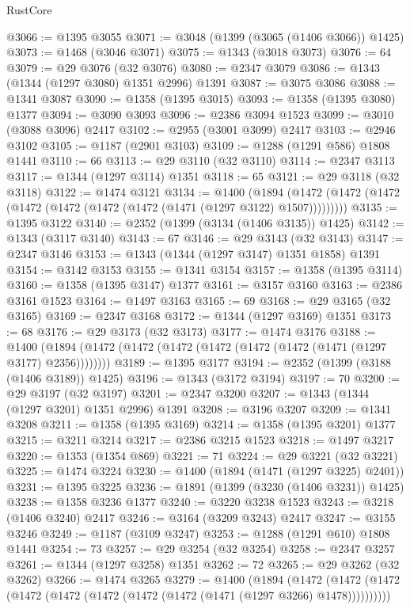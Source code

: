 \begin{lexlean}{RustCore}
\begin{coremodule}
{\begin{coremodule}
{{{{{{{{{{{{{{{{{{{{{{{{{{{{{{{{{{{{{{{{{{{{@3066 := @1395 @3055
@3071 := @3048 (@1399 (@3065 (@1406 @3066)) @1425)
@3073 := @1468 (@3046 @3071)
@3075 := @1343 (@3018 @3073)
@3076 := 64
@3079 := @29 @3076 (@32 @3076)
@3080 := @2347 @3079
@3086 := @1343 (@1344 (@1297 @3080) @1351 @2996) @1391
@3087 := @3075 @3086
@3088 := @1341 @3087
@3090 := @1358 (@1395 @3015)
@3093 := @1358 (@1395 @3080) @1377
@3094 := @3090 @3093
@3096 := @2386 @3094 @1523
@3099 := @3010 (@3088 @3096) @2417
@3102 := @2955 (@3001 @3099) @2417
@3103 := @2946 @3102
@3105 := @1187 (@2901 @3103)
@3109 := @1288 (@1291 @586) @1808 @1441
@3110 := 66
@3113 := @29 @3110 (@32 @3110)
@3114 := @2347 @3113
@3117 := @1344 (@1297 @3114) @1351
@3118 := 65
@3121 := @29 @3118 (@32 @3118)
@3122 := @1474 @3121
@3134 := @1400
    (@1894 (@1472 (@1472 (@1472 (@1472 (@1472 (@1472 (@1472 (@1471 (@1297 @3122) @1507)))))))))
@3135 := @1395 @3122
@3140 := @2352 (@1399 (@3134 (@1406 @3135)) @1425)
@3142 := @1343 (@3117 @3140)
@3143 := 67
@3146 := @29 @3143 (@32 @3143)
@3147 := @2347 @3146
@3153 := @1343 (@1344 (@1297 @3147) @1351 @1858) @1391
@3154 := @3142 @3153
@3155 := @1341 @3154
@3157 := @1358 (@1395 @3114)
@3160 := @1358 (@1395 @3147) @1377
@3161 := @3157 @3160
@3163 := @2386 @3161 @1523
@3164 := @1497 @3163
@3165 := 69
@3168 := @29 @3165 (@32 @3165)
@3169 := @2347 @3168
@3172 := @1344 (@1297 @3169) @1351
@3173 := 68
@3176 := @29 @3173 (@32 @3173)
@3177 := @1474 @3176
@3188 := @1400 (@1894 (@1472 (@1472 (@1472 (@1472 (@1472 (@1472 (@1471 (@1297 @3177) @2356))))))))
@3189 := @1395 @3177
@3194 := @2352 (@1399 (@3188 (@1406 @3189)) @1425)
@3196 := @1343 (@3172 @3194)
@3197 := 70
@3200 := @29 @3197 (@32 @3197)
@3201 := @2347 @3200
@3207 := @1343 (@1344 (@1297 @3201) @1351 @2996) @1391
@3208 := @3196 @3207
@3209 := @1341 @3208
@3211 := @1358 (@1395 @3169)
@3214 := @1358 (@1395 @3201) @1377
@3215 := @3211 @3214
@3217 := @2386 @3215 @1523
@3218 := @1497 @3217
@3220 := @1353 (@1354 @869)
@3221 := 71
@3224 := @29 @3221 (@32 @3221)
@3225 := @1474 @3224
@3230 := @1400 (@1894 (@1471 (@1297 @3225) @2401))
@3231 := @1395 @3225
@3236 := @1891 (@1399 (@3230 (@1406 @3231)) @1425)
@3238 := @1358 @3236 @1377
@3240 := @3220 @3238 @1523
@3243 := @3218 (@1406 @3240) @2417
@3246 := @3164 (@3209 @3243) @2417
@3247 := @3155 @3246
@3249 := @1187 (@3109 @3247)
@3253 := @1288 (@1291 @610) @1808 @1441
@3254 := 73
@3257 := @29 @3254 (@32 @3254)
@3258 := @2347 @3257
@3261 := @1344 (@1297 @3258) @1351
@3262 := 72
@3265 := @29 @3262 (@32 @3262)
@3266 := @1474 @3265
@3279 := @1400
    (@1894
      (@1472 (@1472 (@1472 (@1472 (@1472 (@1472 (@1472 (@1472 (@1471 (@1297 @3266) @1478))))))))))
}}}}}}}}}}}}}}}}}}}}}}}}}}}}}}}}}}}}}}}}}}}}
\end{coremodule}}
\end{coremodule}
\end{lexlean}
